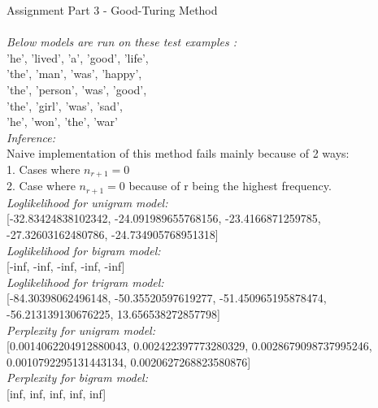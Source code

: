 \documentclass[11ppt]{article}
\begin{document}
{\rmfamily\mdseries\Large Assignment Part 3 - Good-Turing Method}\\
\hrulefill \\
\vspace{3mm}
\textit{Below models are run on these test examples :}\\  'he', 'lived', 'a', 'good', 'life',\\ 'the', 'man', 'was', 'happy',\\ 'the', 'person', 'was', 'good',\\ 'the', 'girl', 'was', 'sad',\\ 'he', 'won', 'the', 'war'\\
\vspace{2mm}
\textit{Inference: }\\
Naive implementation of this method fails mainly because of 2 ways:\\
1. Cases where $n_{r+1} = 0$\\
2. Case where $n_{r+1} = 0$ because of r being the highest frequency.\\
\vspace{2mm}
\textit{Loglikelihood for unigram model:} \\ \vspace{1mm}  [-32.83424838102342, -24.091989655768156, -23.4166871259785, -27.32603162480786, -24.734905768951318]  \\ \vspace{2mm}
\textit{Loglikelihood for bigram model:} \\ \vspace{1mm}  [-inf, -inf, -inf, -inf, -inf]  \\ \vspace{2mm}
\textit{Loglikelihood for trigram model:} \\ \vspace{1mm}  [-84.30398062496148, -50.35520597619277, -51.450965195878474, -56.213139130676225, 13.656538272857798]  \\ \vspace{2mm}
\textit{Perplexity for unigram model:} \\ \vspace{1mm}  [0.0014062204912880043, 0.002422397773280329, 0.0028679098737995246, 0.0010792295131443134, 0.0020627268823580876]  \\ \vspace{2mm}
\textit{Perplexity for bigram model:} \\ \vspace{1mm}  [inf, inf, inf, inf, inf]  \\ \vspace{2mm}
\end{document}
